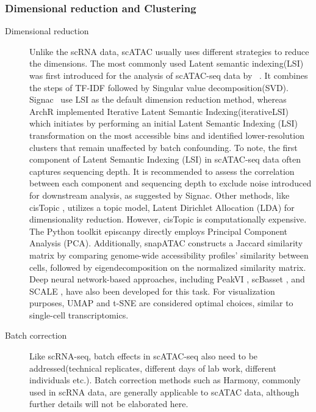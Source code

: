 \subsubsection{Dimensional reduction and Clustering}
\begin{description}
	\item[Dimensional reduction] 
	Unlike the scRNA data, scATAC usually uses different strategies to reduce the dimensions. The most commonly used Latent semantic indexing(LSI) was first introduced for the analysis of scATAC-seq data by ~\citep{cusanovich2015multiplex}. It combines the steps of TF-IDF followed by Singular value decomposition(SVD). Signac~\citep{signac} use LSI as the default dimension reduction method, whereas ArchR implemented Iterative Latent Semantic Indexing(iterativeLSI)~\citep{satpathy2019massively, granja2019single} which initiates by performing an initial Latent Semantic Indexing (LSI) transformation on the most accessible bins and identified lower-resolution clusters that remain unaffected by batch confounding. To note, the first component of Latent Semantic Indexing (LSI) in scATAC-seq data often captures sequencing depth. It is recommended to assess the correlation between each component and sequencing depth to exclude noise introduced for downstream analysis, as suggested by Signac\citep{signac}. Other methods, like cisTopic \citep{bravo2019cistopic}, utilizes a topic model, Latent Dirichlet Allocation (LDA) for dimensionality reduction. However, cisTopic is computationally expensive. The Python toolkit episcanpy \citep{Danese2021episcanpy} directly employs Principal Component Analysis (PCA). Additionally, snapATAC \citep{fang2021snapatac} constructs a Jaccard similarity matrix by comparing genome-wide accessibility profiles' similarity between cells, followed by eigendecomposition on the normalized similarity matrix. Deep neural network-based approaches, including PeakVI \citep{ashuach2022peakvi}, scBasset \citep{yuan2022scbasset}, and SCALE \citep{xiong2019scale}, have also been developed for this task. For visualization purposes, UMAP and t-SNE are considered optimal choices, similar to single-cell transcriptomics. 
	
	\item[Batch correction]
	Like scRNA-seq, batch effects in scATAC-seq also need to be addressed(technical replicates, different days of lab work, different individuals etc.). Batch correction methods such as Harmony\citep{korsunsky2019harmony}, commonly used in scRNA data, are generally applicable to scATAC data, although further details will not be elaborated here.
	

\end{description}
